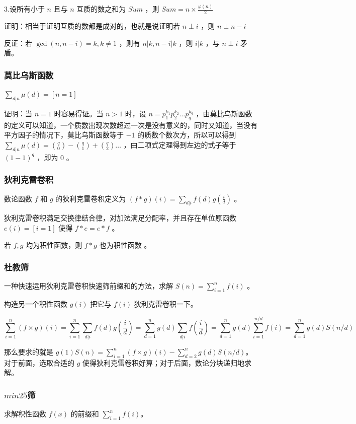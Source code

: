 \documentclass[UTF-8]{ctexart}
\begin{document}
			3.设所有小于 $n$ 且与 $n$ 互质的数之和为 $Sum$ ，则 $Sum=n \times \frac{\varphi(n)}{2}$
	
			证明：相当于证明互质的数都是成对的，也就是说证明若 $n \perp i$ ，则 $n \perp n-i$ 
	 
			反证：若 $\gcd(n,n-i)=k,k \neq 1$ ，则有 $n|k,n-i|k$ ，则 $i|k$ ，与 $n \perp i$ 矛盾。
			\subsubsection{莫比乌斯函数}
			$\sum _ {d|n} \mu(d)=[n=1]$ 
	
			证明：当 $n=1$ 时容易得证。当 $n > 1$ 时，设 $n=p _ 1 ^ {k _ 1} p _ 2 ^ {k _ 2} \dots p _ q ^ {k _ q}$ ，由莫比乌斯函数的定义可以知道，一个质数出现次数超过一次是没有意义的，同时又知道，当没有平方因子的情况下，莫比乌斯函数等于 $-1$ 的质数个数次方，所以可以得到 $\sum _ {d|n} \mu(d)= \binom{q}{0}-\binom{q}{1}+\binom{q}{2} \dots $ ，由二项式定理得到左边的式子等于 $(1-1) ^ q$ ，即为 $0$ 。
			\subsubsection{狄利克雷卷积}
			数论函数 $f$ 和 $g$ 的狄利克雷卷积定义为 $(f * g)(i)=\sum _ {d|i} f(d)g(\frac{i}{d})$ 。
	
			狄利克雷卷积满足交换律结合律，对加法满足分配率，并且存在单位原函数 $e(i)=[i=1]$ 使得 $f * e=e * f$ 。  
	
			若 $f,g$ 均为积性函数，则 $f * g$ 也为积性函数 。
			\subsubsection{杜教筛}
			一种快速运用狄利克雷卷积快速筛前缀和的方法，求解 $S(n)=\sum_{i=1}^n f(i)$ 。
			
			构造另一个积性函数 $g(i)$ 把它与 $f(i)$ 狄利克雷卷积一下。
			
			$$\sum_{i=1}^n (f\times g)(i)=\sum_{i=1}^n \sum_{d|i} f(d)g(\frac{i}{d}) 
			=\sum_{d=1}^n g(d) \sum_{d|i} f(\frac{i}{d}) =\sum_{d=1}^{n} g(d)\sum_{i=1}^{n/d} f(i)=\sum_{d=1}^n g(d)S(n/d)$$
			
			那么要求的就是 $g(1)S(n)=\sum_{i=1}^n (f\times g)(i)-\sum_{d=2}^n g(d)S(n/d)$。对于前面，选取合适的 $g$ 使得狄利克雷卷积好算；对于后面，数论分块递归地求解。
			
			\subsubsection{$min25$筛}
			求解积性函数 $f(x)$ 的前缀和 $\sum _ {i=1} ^ n f(i)$。
			
\end{document}
